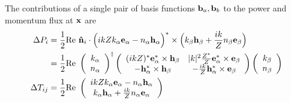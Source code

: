 \documentclass[letterpaper]{article}
\begin{document}
The contributions of a single pair of basis functions
$\mathbf{b}_a, \mathbf{b}_b$ to the power and momentum flux
at $\mathbf{x}$ are
\begin{align}
 \Delta P_i
 &= \frac{1}{2}\text{Re }
    \mathbf{\hat n}_i
    \cdot 
    \Big(ikZ k_\alpha \mathbf{e}_\alpha - n_\alpha \mathbf{h}_\alpha\Big)^* 
    \times
    \Big( k_\beta \mathbf{h}_\beta + \frac{ik}{Z} n_\beta \mathbf{e}_\beta \Big)
\\
&= \frac{1}{2}\text{Re }
   \left(\begin{array}{c}
     k_\alpha \\ n_\alpha 
   \end{array}\right)^\dagger
   \left(\begin{array}{cc}
    (ikZ)^*              \mathbf{e}^*_\alpha \times \mathbf{h}_\beta & 
    |k|^2 \frac{Z^*}{Z}  \mathbf{e}^*_\alpha \times \mathbf{e}_\beta \\
  -                      \mathbf{h}^*_\alpha \times \mathbf{h}_\beta & 
  - \frac{ik}{Z}         \mathbf{h}^*_\alpha \times \mathbf{e}_\beta
   \end{array}\right)
   \left(\begin{array}{c}
     k_\beta\\ n_\beta
   \end{array}\right)
\\
 \Delta T_{ij}
 &= \frac{1}{2}\text{Re }
    \left(\begin{array}{c}
    ikZ k_\alpha \mathbf{e}_\alpha - n_\alpha \mathbf{h}_\alpha \\
        k_\alpha \mathbf{h}_\alpha + \frac{ik}{Z} n_\alpha \mathbf{e}_\alpha
    \end{array}\right)
\end{align}

\newpage


\end{document}

